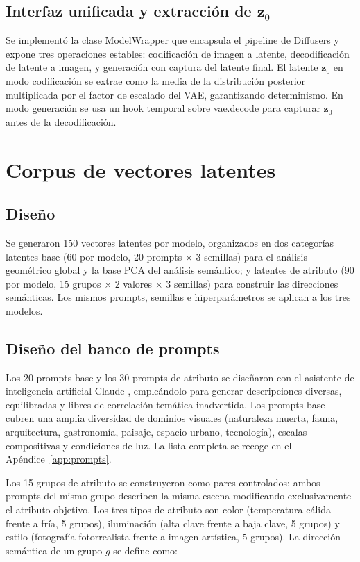 \documentclass[12pt, a4paper, twoside]{book}
\newcommand{\z}{\mathbf{z}}
\begin{document}
\subsection{Interfaz unificada y extracción de $\z_0$}

Se implementó la clase ModelWrapper que encapsula el pipeline de Diffusers y expone tres operaciones estables: codificación de imagen a latente, decodificación de latente a imagen, y generación con captura del latente final. El latente $\z_0$ en modo codificación se extrae como la media de la distribución posterior multiplicada por el factor de escalado del VAE, garantizando determinismo. En modo generación se usa un hook temporal sobre vae.decode para capturar $\z_0$ antes de la decodificación.

\section{Corpus de vectores latentes}
\label{sec:corpus}

\subsection{Diseño}

Se generaron 150 vectores latentes por modelo, organizados en dos categorías latentes base (60 por modelo, 20 prompts $\times$ 3 semillas) para el análisis geométrico global y la base PCA del análisis semántico; y latentes de atributo (90 por modelo, 15 grupos $\times$ 2 valores $\times$ 3 semillas) para construir las direcciones semánticas. Los mismos prompts, semillas e hiperparámetros se aplican a los tres modelos.

\subsection{Diseño del banco de prompts}

Los 20 prompts base y los 30 prompts de atributo se diseñaron con el asistente de inteligencia artificial Claude \citep{anthropic2024claude}, empleándolo para generar descripciones diversas, equilibradas y libres de correlación temática inadvertida. Los prompts base cubren una amplia diversidad de dominios visuales (naturaleza muerta, fauna, arquitectura, gastronomía, paisaje, espacio urbano, tecnología), escalas compositivas y condiciones de luz. La lista completa se recoge en el Apéndice~\ref{app:prompts}.

Los 15 grupos de atributo se construyeron como pares controlados: ambos prompts del mismo grupo describen la misma escena modificando exclusivamente el atributo objetivo. Los tres tipos de atributo son color (temperatura cálida frente a fría, 5 grupos), iluminación (alta clave frente a baja clave, 5 grupos) y estilo (fotografía fotorrealista frente a imagen artística, 5 grupos). La dirección semántica de un grupo $g$ se define como:
\end{document}

